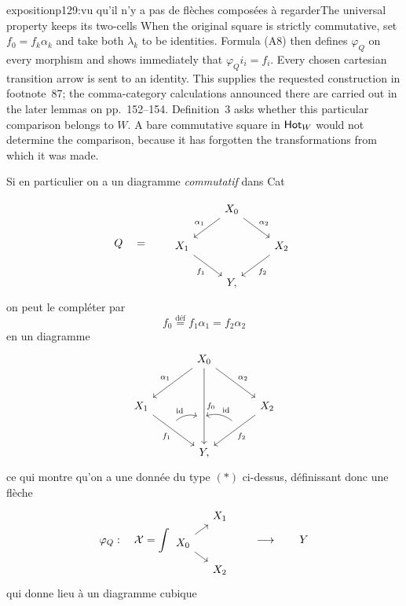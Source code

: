 \begin{dcomment}{exposition}{p129:vu qu'il n'y a pas de flèches composées à regarder}{The universal property keeps its two-cells}
When the original square is strictly commutative, set $f_0=f_k\alpha_k$ and take both $\lambda_k$ to be identities.  Formula (A8) then defines $\varphi_Q$ on every morphism and shows immediately that $\varphi_Qi_i=f_i$.  Every chosen cartesian transition arrow is sent to an identity.  This supplies the requested construction in footnote~87; the comma-category calculations announced there are carried out in the later lemmas on pp.~152--154.  Definition~3 asks whether this particular comparison belongs to $W$.  A bare commutative square in $\mathsf{Hot}_W$ would not determine the comparison, because it has forgotten the transformations from which it was made.
\end{dcomment}


Si en particulier on a un diagramme \textit{commutatif} dans Cat

\[
Q \quad = \qquad
\begin{tikzcd}
 & X_0 \arrow[dl, "\alpha_1"'] \arrow[dr, "\alpha_2"] & \\
X_1 \arrow[dr, "f_1"'] & & X_2 \arrow[dl, "f_2"] \\
 & Y, &
\end{tikzcd}
\]
on peut le compléter par
\[
f_0 \overset{\text{déf}}{=} f_1\alpha_1 = f_2\alpha_2
\]
en un diagramme
\[
\begin{tikzcd}[row sep=large, column sep=large]
 & X_0 \arrow[dl, "\alpha_1"'] \arrow[dr, "\alpha_2"] \arrow[dd, "f_0", ""'{name=F0, pos=0.65}] & \\
X_1 \arrow[dr, "f_1"', ""{name=F1, pos=0.4}] & & X_2 \arrow[dl, "f_2", ""'{name=F2, pos=0.4}] \\
 & Y, &
\arrow[from=F1, to=F0, bend left, "\mathrm{id}", shorten <=2pt, shorten >=2pt]
\arrow[from=F2, to=F0, bend right, "\mathrm{id}"', shorten <=2pt, shorten >=2pt]
\end{tikzcd}
\]
ce qui montre qu'on a une donnée du type $(*)$ ci-dessus, définissant donc une flèche
\[
\varphi_Q : \quad \sX = \int
\begin{tikzcd}[row sep=small, column sep=small]
 & X_1 \\
X_0 \arrow[ur] \arrow[dr] & \\
 & X_2
\end{tikzcd}
\qquad \longrightarrow \qquad Y
\]
qui donne lieu à un diagramme cubique

